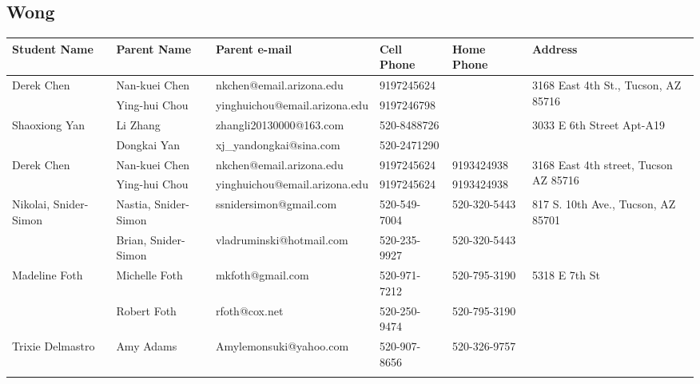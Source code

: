 \documentclass[landscape]{article}\usepackage[]{graphicx}\usepackage[]{color}
\begin{document}
\subsection{Wong}
\begin{longtable}{p{70pt}|p{75pt}|p{120pt}|p{60pt}|p{60pt}|p{120pt}|}
Student Name & Parent Name & Parent e-mail & Cell Phone & Home Phone & Address\\
\hline
\multirow{2}{70pt}{Derek Chen} & Nan-kuei Chen & nkchen@email.arizona.edu & 9197245624 &  & \multirow{2}{100pt}{3168 East 4th St., Tucson, AZ 85716} \\
 & Ying-hui Chou & yinghuichou@email.arizona.edu & 9197246798 &  & \\
\hline
\multirow{2}{70pt}{Shaoxiong Yan} & Li Zhang & zhangli20130000@163.com & 520-8488726 &  & \multirow{2}{100pt}{3033 E 6th Street Apt-A19} \\
 & Dongkai Yan & xj\_yandongkai@sina.com & 520-2471290 &  & \\
\hline
\multirow{2}{70pt}{Derek Chen} & Nan-kuei Chen & nkchen@email.arizona.edu & 9197245624 & 9193424938 & \multirow{2}{100pt}{3168 East 4th street, Tucson AZ 85716} \\
 & Ying-hui Chou & yinghuichou@email.arizona.edu & 9197245624 & 9193424938 & \\
\hline
\multirow{2}{70pt}{Nikolai, Snider-Simon} & Nastia, Snider-Simon & ssnidersimon@gmail.com & 520-549-7004 & 520-320-5443 & \multirow{2}{100pt}{817 S. 10th Ave., Tucson, AZ 85701} \\
 & Brian, Snider-Simon & vladruminski@hotmail.com & 520-235-9927 & 520-320-5443 & \\
\hline
\multirow{2}{70pt}{Madeline Foth} & Michelle Foth & mkfoth@gmail.com & 520-971-7212 & 520-795-3190 & \multirow{2}{100pt}{5318 E 7th St} \\
 & Robert Foth & rfoth@cox.net & 520-250-9474 & 520-795-3190 & \\
\hline
\multirow{2}{70pt}{Trixie Delmastro } & Amy Adams & Amylemonsuki@yahoo.com & 520-907-8656 & 520-326-9757 & \multirow{2}{100pt}{} \\
 &  &  &  &  & \\
\hline
\end{longtable}
\newpage
\end{document}
